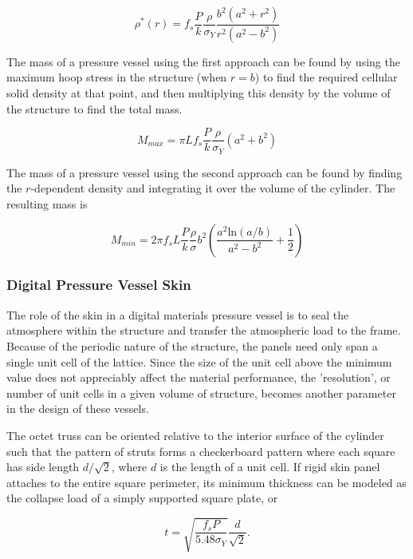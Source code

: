 \documentclass[twocolumn,letterpaper]{IEEEAerospaceCLS}  %
\begin{document}
\begin{equation}
\rho^*(r) = f_s\frac{P}{k}\frac{\rho}{\sigma_Y}\frac{b^2(a^2+r^2)}{r^2(a^2-b^2)}
\end{equation}

The mass of a pressure vessel using the first approach can be found by using the maximum hoop stress in the structure (when $r = b$) to find the required cellular solid density at that point, and then multiplying this density by the volume of the structure to find the total mass. 

\begin{equation}
M_{max} = \pi L f_s\frac{P}{k}\frac{\rho}{\sigma_Y}(a^2+b^2)
\end{equation}

The mass of a pressure vessel using the second approach can be found by finding the $r$-dependent density and integrating it over the volume of the cylinder. The resulting mass is 

\begin{equation}
M_{min} = 2\pi f_sL\frac{P}{k}\frac{\rho}{\sigma}b^2\left(\frac{a^2\textrm{ln}(a/b)}{a^2-b^2}+\frac{1}{2}\right)
\end{equation}

\subsubsection{Digital Pressure Vessel Skin}
The role of the skin in a digital materials pressure vessel is to seal the atmosphere within the structure and transfer the atmospheric load to the frame. Because of the periodic nature of the structure, the panels need only span a single unit cell of the lattice. Since the size of the unit cell above the minimum value does not appreciably affect the material performance, the 'resolution', or number of unit cells in a given volume of structure, becomes another parameter in the design of these vessels.

The octet truss can be oriented relative to the interior surface of the cylinder such that the pattern of struts forms a checkerboard pattern where each square has side length $d/\sqrt{2}$, where $d$ is the length of a unit cell. If rigid skin panel attaches to the entire square perimeter, its minimum thickness can be modeled as the collapse load of a simply supported square plate\cite{young2002roark}, or

\begin{equation}
t = \sqrt{\frac{f_sP}{5.48\sigma_Y}}\frac{d}{\sqrt{2}}.
\end{equation}
\end{document}
